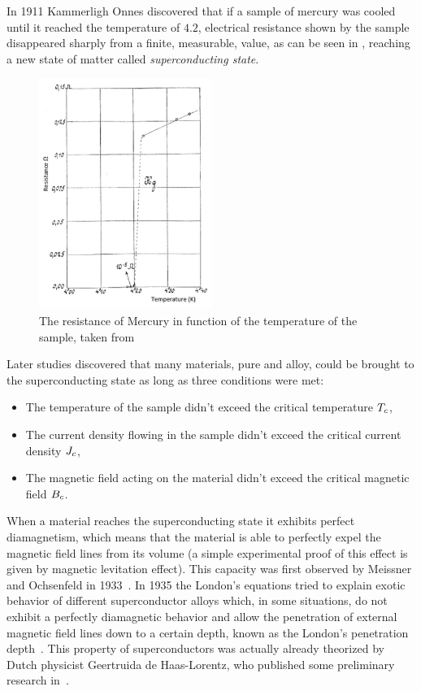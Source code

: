 In 1911 \cite{invention-superconductivity} Kammerligh Onnes discovered that if a sample of mercury was cooled
until it reached the temperature of $4.2$\K, electrical resistance shown by the sample disappeared
sharply from a finite, measurable, value, as can be seen in , reaching
a new state of matter called \emph{superconducting state}.
\begin{figure}
	\centering
	\includegraphics[width=0.5\textwidth]{./img/mercury-resistance.png}
	\caption{The resistance of Mercury in function of the temperature of the sample, taken from~\cite{tsukerman2020compendium}}
	\label{img:mercury-resistance}
\end{figure}

Later studies discovered that many materials, pure and alloy, could be brought to the
superconducting state as long as three conditions were met:
\begin{itemize}
	\item The temperature of the sample didn't exceed the critical temperature $T_c$,
	\item The current density flowing in the sample didn't exceed the critical current
	      density $J_c$,
	\item The magnetic field acting on the material didn't exceed the critical magnetic field $B_c$.
\end{itemize}

When a material reaches the superconducting state it exhibits perfect diamagnetism, which means that
the material is able to perfectly expel the magnetic field lines from its volume (a simple experimental proof of this effect
is given by magnetic levitation effect). This capacity was first observed by
Meissner and Ochsenfeld in 1933~\cite{meissner1933}. In 1935 the London's equations tried to explain
exotic behavior of different superconductor alloys which, in some situations, do not exhibit a perfectly diamagnetic behavior and allow the
penetration of external magnetic field lines down to a certain depth, known as the London's
penetration depth~\cite{london1935}. This property of superconductors was actually already theorized by Dutch
physicist Geertruida de Haas-Lorentz, who published some preliminary research in~\cite{fokker1925physica}.

